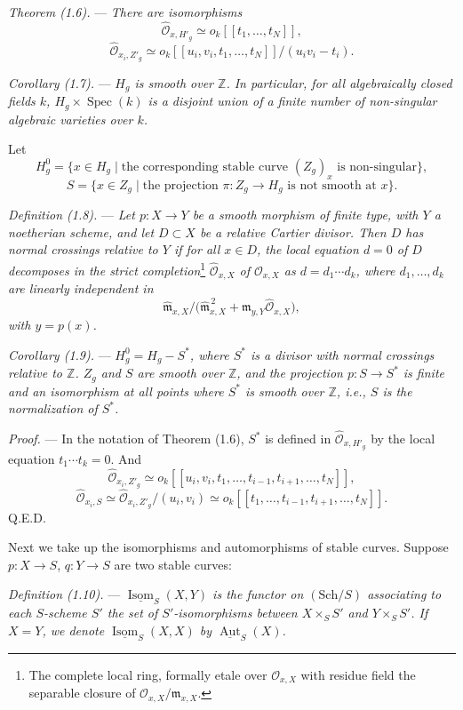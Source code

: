 \documentclass[10pt]{article}
\newcommand{\Spec}{\operatorname{Spec}}
\newcommand{\Aut}{\operatorname{Aut}}
\newcommand{\Isom}{\operatorname{Isom}}
\newcommand{\cO}{\mathcal O}
\newcommand{\QED}{\hfill Q.E.D.}
\begin{document}
\medskip
\noindent\emph{Theorem (1.6).} --- \emph{There are isomorphisms}
\[
\widehat{\cO}_{x,H'_g}\simeq o_k[[t_1,\ldots,t_N]],
\]
\[
\widehat{\cO}_{x_i,Z'_g}\simeq o_k[[u_i,v_i,t_1,\ldots,t_N]]/(u_i v_i-t_i).
\]

\medskip
\noindent\emph{Corollary (1.7).} --- \emph{$H_g$ is smooth over $\mathbb Z$. In particular, for all algebraically closed fields $k$, $H_g\times\Spec(k)$ is a disjoint union of a finite number of non-singular algebraic varieties over $k$.}

Let
\[
H_g^0=\{x\in H_g\mid \text{the corresponding stable curve }(Z_g)_x\text{ is non-singular}\},
\]
\[
S=\{x\in Z_g\mid \text{the projection }\pi:Z_g\to H_g\text{ is not smooth at }x\}.
\]

\medskip
\noindent\emph{Definition (1.8).} --- \emph{Let $p:X\to Y$ be a smooth morphism of finite type, with $Y$ a noetherian scheme, and let $D\subset X$ be a relative Cartier divisor. Then $D$ has normal crossings relative to $Y$ if for all $x\in D$, the local equation $d=0$ of $D$ decomposes in the strict completion}\footnote{The complete local ring, formally etale over $\cO_{x,X}$ with residue field the separable closure of $\cO_{x,X}/\mathfrak m_{x,X}$.}\emph{ $\widehat{\cO}_{x,X}$ of $\cO_{x,X}$ as $d=d_1\cdots d_k$, where $d_1,\ldots,d_k$ are linearly independent in}
\[
\widehat{\mathfrak m}_{x,X}/\bigl(\widehat{\mathfrak m}_{x,X}^{\,2}+\mathfrak m_{y,Y}\widehat{\cO}_{x,X}\bigr),
\]
\emph{with $y=p(x)$.}

\medskip
\noindent\emph{Corollary (1.9).} --- \emph{$H_g^0=H_g-S^*$, where $S^*$ is a divisor with normal crossings relative to $\mathbb Z$. $Z_g$ and $S$ are smooth over $\mathbb Z$, and the projection $p:S\to S^*$ is finite and an isomorphism at all points where $S^*$ is smooth over $\mathbb Z$, i.e., $S$ is the normalization of $S^*$.}

\noindent\emph{Proof.} --- In the notation of Theorem (1.6), $S^*$ is defined in $\widehat{\cO}_{x,H'_g}$ by the local equation $t_1\cdots t_k=0$. And
\[
\widehat{\cO}_{x_i,Z'_g}\simeq o_k[[u_i,v_i,t_1,\ldots,t_{i-1},t_{i+1},\ldots,t_N]],
\]
\[
\widehat{\cO}_{x_i,S}\simeq \widehat{\cO}_{x_i,Z'_g}/(u_i,v_i)
\simeq o_k[[t_1,\ldots,t_{i-1},t_{i+1},\ldots,t_N]].
\]
\QED


Next we take up the isomorphisms and automorphisms of stable curves. Suppose $p:X\to S$, $q:Y\to S$ are two stable curves:

\medskip
\noindent\emph{Definition (1.10).} --- \emph{$\underline{\Isom}_S(X,Y)$ is the functor on $(\mathrm{Sch}/S)$ associating to each $S$-scheme $S'$ the set of $S'$-isomorphisms between $X\times_S S'$ and $Y\times_S S'$. If $X=Y$, we denote $\underline{\Isom}_S(X,X)$ by $\underline{\Aut}_S(X)$.}
\end{document}
